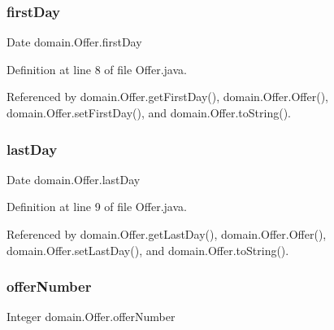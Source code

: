 \mbox{\label{classdomain_1_1Offer_ac30c7d7ca38555fecc523259c15bd6b0}} 
\subsubsection{\texorpdfstring{firstDay}{firstDay}}
{\footnotesize\ttfamily Date domain.\+Offer.\+first\+Day\hspace{0.3cm}{\ttfamily [private]}}



Definition at line 8 of file Offer.\+java.



Referenced by domain.\+Offer.\+get\+First\+Day(), domain.\+Offer.\+Offer(), domain.\+Offer.\+set\+First\+Day(), and domain.\+Offer.\+to\+String().

\mbox{\label{classdomain_1_1Offer_a4d415274c0e120dd3e66e4ad46d7e2b2}} 
\subsubsection{\texorpdfstring{lastDay}{lastDay}}
{\footnotesize\ttfamily Date domain.\+Offer.\+last\+Day\hspace{0.3cm}{\ttfamily [private]}}



Definition at line 9 of file Offer.\+java.



Referenced by domain.\+Offer.\+get\+Last\+Day(), domain.\+Offer.\+Offer(), domain.\+Offer.\+set\+Last\+Day(), and domain.\+Offer.\+to\+String().

\mbox{\label{classdomain_1_1Offer_af77beec2989adcfb9b7b7ef399f9b363}} 
\subsubsection{\texorpdfstring{offerNumber}{offerNumber}}
{\footnotesize\ttfamily Integer domain.\+Offer.\+offer\+Number\hspace{0.3cm}{\ttfamily [private]}}




